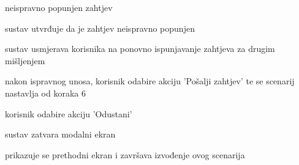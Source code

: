 \begin{packed_item}
						\item[] \begin{packed_item}
                            \item[5.a] neispravno popunjen zahtjev
                            \item[] \begin{packed_enum}
                            	\item sustav utvrđuje da je zahtjev neispravno popunjen
								\item sustav usmjerava korisnika na ponovno ispunjavanje zahtjeva za drugim mišljenjem
								\item nakon ispravnog unosa, korisnik odabire akciju 'Pošalji zahtjev' te se scenarij nastavlja od koraka 6
							\end{packed_enum}
							\item[5.b] korisnik odabire akciju 'Odustani'
                            \item[] \begin{packed_enum}
                            	\item sustav zatvara modalni ekran
								\item prikazuje se prethodni ekran i završava izvođenje ovog scenarija
							\end{packed_enum}
						\end{packed_item}
					\end{packed_item}


